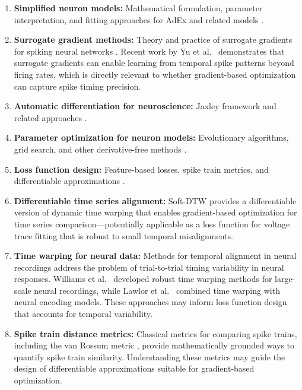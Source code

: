 \documentclass{article}
\begin{document}
\begin{enumerate}
  \item \textbf{Simplified neuron models:} Mathematical formulation, parameter interpretation, and fitting approaches for AdEx and related models \cite{Brette2005, Naud2008}.
  \item \textbf{Surrogate gradient methods:} Theory and practice of surrogate gradients for spiking neural networks \cite{Neftci2019, Zenke2018, Gygax2025}. Recent work by Yu et al.\ \cite{Yu2025} demonstrates that surrogate gradients can enable learning from temporal spike patterns beyond firing rates, which is directly relevant to whether gradient-based optimization can capture spike timing precision.
  \item \textbf{Automatic differentiation for neuroscience:} Jaxley framework and related approaches \cite{Deistler2025, Jones2024}.
  \item \textbf{Parameter optimization for neuron models:} Evolutionary algorithms, grid search, and other derivative-free methods \cite{VanGeit2008, Guarino2025}.
  \item \textbf{Loss function design:} Feature-based losses, spike train metrics, and differentiable approximations \cite{Jolivet2008, Guarino2025}.
  \item \textbf{Differentiable time series alignment:} Soft-DTW \cite{Cuturi2017} provides a differentiable version of dynamic time warping that enables gradient-based optimization for time series comparison---potentially applicable as a loss function for voltage trace fitting that is robust to small temporal misalignments.
  \item \textbf{Time warping for neural data:} Methods for temporal alignment in neural recordings \cite{Williams2020, Lawlor2018} address the problem of trial-to-trial timing variability in neural responses. Williams et al.\ \cite{Williams2020} developed robust time warping methods for large-scale neural recordings, while Lawlor et al.\ \cite{Lawlor2018} combined time warping with neural encoding models. These approaches may inform loss function design that accounts for temporal variability.
  \item \textbf{Spike train distance metrics:} Classical metrics for comparing spike trains, including the van Rossum metric \cite{Houghton2009}, provide mathematically grounded ways to quantify spike train similarity. Understanding these metrics may guide the design of differentiable approximations suitable for gradient-based optimization.
\end{enumerate}
\end{document}
